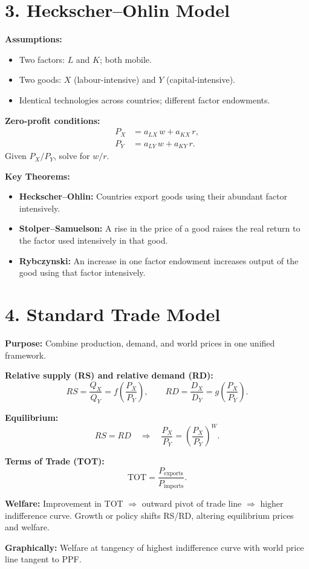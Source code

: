 \documentclass[12pt]{article}
\begin{document}
\vspace{1em}

\section*{3. Heckscher--Ohlin Model}

\textbf{Assumptions:}
\begin{itemize}
\item Two factors: \( L \) and \( K \); both mobile.
\item Two goods: \( X \) (labour-intensive) and \( Y \) (capital-intensive).
\item Identical technologies across countries; different factor endowments.
\end{itemize}

\textbf{Zero-profit conditions:}
\[
\begin{aligned}
P_X &= a_{LX} \, w + a_{KX} \, r, \\
P_Y &= a_{LY} \, w + a_{KY} \, r.
\end{aligned}
\]
Given \( P_X/P_Y \), solve for \( w/r \).

\textbf{Key Theorems:}
\begin{itemize}
\item \textbf{Heckscher--Ohlin:} Countries export goods using their abundant factor intensively.
\item \textbf{Stolper--Samuelson:} A rise in the price of a good raises the real return to the factor used intensively in that good.
\item \textbf{Rybczynski:} An increase in one factor endowment increases output of the good using that factor intensively.
\end{itemize}

\vspace{1em}

\section*{4. Standard Trade Model}

\textbf{Purpose:} Combine production, demand, and world prices in one unified framework.

\textbf{Relative supply (RS) and relative demand (RD):}
\[
RS = \frac{Q_X}{Q_Y} = f\!\left(\frac{P_X}{P_Y}\right), \qquad RD = \frac{D_X}{D_Y} = g\!\left(\frac{P_X}{P_Y}\right).
\]

\textbf{Equilibrium:}
\[
RS = RD \quad \Rightarrow \quad \frac{P_X}{P_Y} = \left(\frac{P_X}{P_Y}\right)^{W}.
\]

\textbf{Terms of Trade (TOT):}
\[
\text{TOT} = \frac{P_{\text{exports}}}{P_{\text{imports}}}.
\]

\textbf{Welfare:}
Improvement in TOT \(\Rightarrow\) outward pivot of trade line \(\Rightarrow\) higher indifference curve.  
Growth or policy shifts RS/RD, altering equilibrium prices and welfare.

\textbf{Graphically:} Welfare at tangency of highest indifference curve with world price line tangent to PPF.
\end{document}
